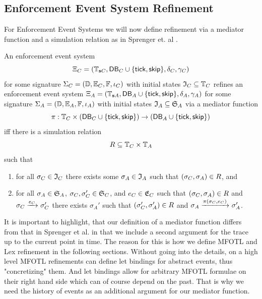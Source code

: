 \subsection{Enforcement Event System Refinement}

For Enforcement Event Systems we will now define refinement
via a mediator function and a simulation relation as in Sprenger et. al \cite{igloo}.

\begin{definition}
    \label{def:enforcement-event-system-refinement}
    An enforcement event system
    $$\Xi_C =
    ( \mathbb{T}_{\mathbf{s} C}, \mathsf{DB}_C \cup \{\mathsf{tick}, \mathsf{skip} \}, \delta_C, \gamma_C )$$
    for some signature 
    $\Sigma_C = \left( \mathbb{D}, \mathbb{E}_C, \mathbb{F}, \iota_C \right)$
    with initial states $\mathfrak{I}_C \subseteq \mathbb{T}_C$
    refines an enforcement event system
    $\Xi_A = \left( \mathbb{T}_{\mathbf{s} A}, \mathsf{DB}_A \cup \{\mathsf{tick}, \mathsf{skip} \}, \delta_A, \gamma_A \right)$
    for some signature 
    $\Sigma_A = \left( \mathbb{D}, \mathbb{E}_A, \mathbb{F}, \iota_A \right)$
    with initial states $\mathfrak{I}_A \subseteq \mathfrak{S}_A$
    via a mediator function
    \begin{equation*}
        \pi : \mathbb{T}_C \times (\mathsf{DB}_C \cup \{ \mathsf{tick}, \mathsf{skip} \})
        \to (\mathsf{DB}_A \cup \{ \mathsf{tick}, \mathsf{skip} \})
    \end{equation*}
    iff
    there is a simulation relation
    \begin{equation*}
        R \subseteq \mathbb{T}_C \times \mathbb{T}_A
    \end{equation*}
    such that
    \begin{enumerate}
        \item
            for all $\sigma_C \in \mathfrak{I}_C$ there exists some
            $\sigma_A \in \mathfrak{I}_A$ such that
            $(\sigma_C, \sigma_A) \in R$, and
        \item
            for all $\sigma_A \in \mathfrak{S}_A$,
            $\sigma_C, \sigma_C' \in \mathfrak{S}_C$, and
            $e_C \in \mathfrak{E}_C$
            such that $(\sigma_C, \sigma_A) \in R$ and
            $\sigma_C \xrightarrow{e_C}_{} \sigma_C'$
            there exists $\sigma_A'$
            such that $(\sigma_C', \sigma_A') \in R$ and
            $\sigma_A \xrightarrow{\pi(\sigma_C, e_C)}_{} \sigma_A'$.
    \end{enumerate}
    
\end{definition}
It is important to highlight, that our definition of a mediator function
differs from that in Sprenger et al. \cite{igloo} in that we include a second
argument for the trace up to the current point in time.
The reason for this is how we define MFOTL and Lex refinement in the following
sections.
Without going into the details, on a high level MFOTL refinements can define
let bindings for abstract events, thus "concretizing" them.
And let bindings allow for arbitrary MFOTL formulae on their right hand side which
can of course depend on the past.
That is why we need the history of events as an additional argument for our mediator
function.


